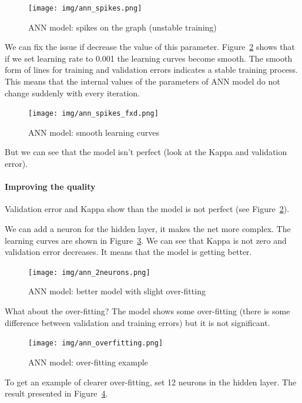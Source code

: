 \documentclass{report}
\begin{document}
\begin{figure}[h!]
\centering
\texttt{[image: img/ann\_spikes.png]}
\caption{ANN model: spikes on the graph (unstable training)}
\label{fig:ann_spikes}
\end{figure}

We can fix the issue if decrease the value of this parameter. Figure~\ref{fig:ann_spikes_fxd} shows 
that if we set learning rate to 0.001 the learning curves become smooth. The smooth form of 
lines for training and validation errors indicates a stable training process. This means that the
internal values of the parameters of ANN model do not change suddenly with every iteration. 


\begin{figure}[h!]
\centering
\texttt{[image: img/ann\_spikes\_fxd.png]}
\caption{ANN model: smooth learning curves}
\label{fig:ann_spikes_fxd}
\end{figure}


But we can see that the model isn't perfect (look at the Kappa and validation error).

\paragraph{Improving the quality} Validation error and Kappa show than the model is not perfect (see Figure~\ref{fig:ann_spikes_fxd}).

We can add a neuron for the hidden layer, it makes the net more complex. The learning curves are shown in Figure~\ref{fig:ann_2neurons}.
We can see that Kappa is not zero and validation error decreases. It means that the model is getting better. 

\begin{figure}[h!]
\centering
\texttt{[image: img/ann\_2neurons.png]}
\caption{ANN model: better model with slight over-fitting}
\label{fig:ann_2neurons}
\end{figure}

What about the over-fitting? The model shows some over-fitting (there is some difference between validation and training errors) but it is not significant.

\begin{figure}[h!]
\centering
\texttt{[image: img/ann\_overfitting.png]}
\caption{ANN model: over-fitting example}
\label{fig:ann_overfitting}
\end{figure}

To get an example of clearer over-fitting, set 12 neurons in the hidden layer. 
The result presented in Figure~\ref{fig:ann_overfitting}.
\end{document}
